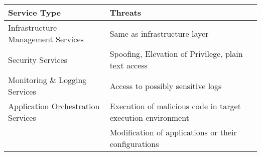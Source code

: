 \begin{tabularx}{0.7\linewidth}{
    | p{15em}
    | >{\raggedright\arraybackslash}X
    |
  }
  \hline
  Service Type                       & Threats                                                     \\
  \hline
  \hline
  Infrastructure Management Services & Same as infrastructure layer                                \\
  \hline
  Security Services                  & Spoofing, Elevation of Privilege, plain text access         \\
  \hline
  Monitoring \& Logging Services     & Access to possibly sensitive logs                           \\
  \hline
  Application Orchestration Services & Execution of malicious code in target execution environment \\
  \cline{2-2}
                                     & Modification of applications or their configurations        \\
  \hline
\end{tabularx}
